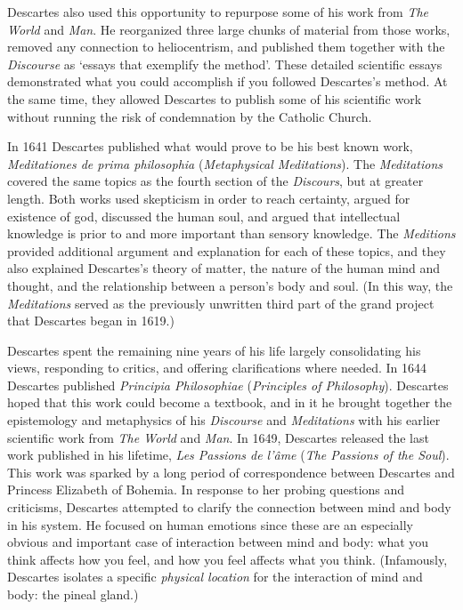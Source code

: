 Descartes also used this opportunity to repurpose some of his work from \textit{The World} and \textit{Man}. He reorganized three large chunks of material from those works, removed any connection to heliocentrism, and published them together with the \textit{Discourse} as `essays that exemplify the method'. These detailed scientific essays demonstrated what you could accomplish if you followed Descartes's method. At the same time, they allowed Descartes to publish some of his scientific work without running the risk of condemnation by the Catholic Church.

In 1641 Descartes published what would prove to be his best known work, \textit{Meditationes de prima philosophia} (\textit{Metaphysical Meditations}). The \textit{Meditations} covered the same topics as the fourth section of the \textit{Discours}, but at greater length. Both works used skepticism in order to reach certainty, argued for existence of god, discussed the human soul, and argued that intellectual knowledge is prior to and more important than sensory knowledge. The \textit{Meditions} provided additional argument and explanation for each of these topics, and they also explained Descartes's theory of matter, the nature of the human mind and thought, and the relationship between a person's body and soul. (In this way, the \textit{Meditations} served as the previously unwritten third part of the grand project that Descartes began in 1619.)

Descartes spent the remaining nine years of his life largely consolidating his views, responding to critics, and offering clarifications where needed. In 1644 Descartes published \textit{Principia Philosophiae} (\textit{Principles of Philosophy}). Descartes hoped that this work could become a textbook, and in it he brought together the epistemology and metaphysics of his \textit{Discourse} and \textit{Meditations} with his earlier scientific work from \textit{The World} and \textit{Man}. In 1649, Descartes released the last work published in his lifetime, \textit{Les Passions de l'âme} (\textit{The Passions of the Soul}). This work was sparked by a long period of correspondence between Descartes and Princess Elizabeth of Bohemia. In response to her probing questions and criticisms, Descartes attempted to clarify the connection between mind and body in his system. He focused on human emotions since these are an especially obvious and important case of interaction between mind and body: what you think affects how you feel, and how you feel affects what you think. (Infamously, Descartes isolates a specific \textit{physical location} for the interaction of mind and body: the pineal gland.)

